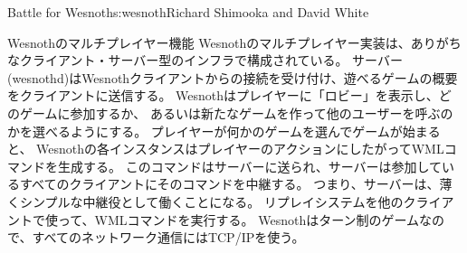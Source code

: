 \begin{aosachapter}{Battle for Wesnoth}{s:wesnoth}{Richard Shimooka and David White}
\begin{aosasect1}{Wesnothのマルチプレイヤー機能}
Wesnothのマルチプレイヤー実装は、ありがちなクライアント・サーバー型のインフラで構成されている。
サーバー(wesnothd)はWesnothクライアントからの接続を受け付け、遊べるゲームの概要をクライアントに送信する。
Wesnothはプレイヤーに「ロビー」を表示し、どのゲームに参加するか、
あるいは新たなゲームを作って他のユーザーを呼ぶのかを選べるようにする。
プレイヤーが何かのゲームを選んでゲームが始まると、
Wesnothの各インスタンスはプレイヤーのアクションにしたがってWMLコマンドを生成する。
このコマンドはサーバーに送られ、サーバーは参加しているすべてのクライアントにそのコマンドを中継する。
つまり、サーバーは、薄くシンプルな中継役として働くことになる。
リプレイシステムを他のクライアントで使って、WMLコマンドを実行する。
Wesnothはターン制のゲームなので、すべてのネットワーク通信にはTCP/IPを使う。


\end{aosasect1}
\end{aosachapter}

